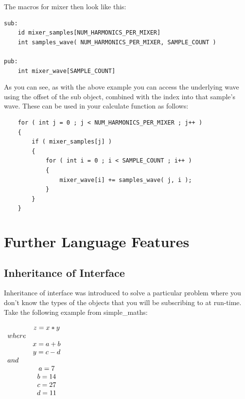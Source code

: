 \documentclass{report}
\begin{document}
The macros for mixer then look like this:

\begin{verbatim}
sub:
    id mixer_samples[NUM_HARMONICS_PER_MIXER]
    int samples_wave( NUM_HARMONICS_PER_MIXER, SAMPLE_COUNT )

pub:
    int mixer_wave[SAMPLE_COUNT]
\end{verbatim}

As you can see, as with the above example you can access the underlying wave using the offset of the sub object, combined with the index into that sample's wave. These can be used in your calculate function as follows:

\begin{verbatim}
    for ( int j = 0 ; j < NUM_HARMONICS_PER_MIXER ; j++ )
    {
        if ( mixer_samples[j] )
        {
            for ( int i = 0 ; i < SAMPLE_COUNT ; i++ )
            {
                mixer_wave[i] += samples_wave( j, i );
            }
        }
    }
\end{verbatim}

\chapter{Further Language Features}

\section{Inheritance of Interface}

Inheritance of interface was introduced to solve a particular problem where you don't know the types of the objects that you will be subscribing to at run-time. Take the following example from simple_maths:

\begin{math}
  \begin{array}{ l c }
        & z = x * y   \\
        where         \\
        & x = a + b   \\
        & y = c - d   \\
        and           \\
        & a = 7       \\
        & b = 14      \\
        & c = 27      \\
        & d = 11      \\
  \end{array}
\end{math}
\end{document}
